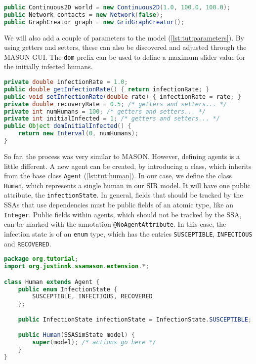 \documentclass[a4paper, 12pt, bibliography=numbered]{article}
\begin{document}
\begin{lstlisting}[label=lst:tut:environment,caption={The environment for our agents.},language=Java]
public Continuous2D world = new Continuous2D(1.0, 100.0, 100.0);
public Network contacts = new Network(false);
public GraphCreator graph = new GridGraphCreator();
\end{lstlisting}

We will also add a couple of parameters to the model (\autoref{lst:tut:parameters}). By using getters and setters, these can also be discovered and adjusted through the MASON GUI. The \texttt{dom}-prefix can be used to define a maximum slider value for the initially infected humans.

\begin{lstlisting}[label=lst:tut:parameters,caption={Parameters of the model.},language=Java]
private double infectionRate = 1.0;
public double getInfectionRate() { return infectionRate; }
public void setInfectionRate(double rate) { infectionRate = rate; }
private double recoveryRate = 0.5; /* getters and setters... */
private int numHumans = 100; /* getters and setters... */
private int initialInfected = 1; /* getters and setters... */
public Object domInitialInfected() {
	return new Interval(0, numHumans);
}
\end{lstlisting}

So far, the process was very similar to MASON. However, defining agents is a little different. A new agent can be created, by introducing a class, which inherits from the base class \texttt{Agent} (\autoref{lst:tut:human}). In our case, we define the class \texttt{Human}, which represents a single human in our SIR model. It will have one public attribute, the \texttt{infectionState}. In general, fields that should be tracked by the SSAs that use dependencies must be public fields of an atomic type, like an \texttt{Integer}. Public fields within agents, which should not be tracked by the SSA, can be marked with the annotation \texttt{@NoAgentAttribute}. In this case, the infection state is of an \texttt{enum} type, which has the entries \texttt{SUSCEPTIBLE}, \texttt{INFECTIOUS} and \texttt{RECOVERED}.

\begin{lstlisting}[label=lst:tut:human,caption={The basis of our Human agent.},language=Java]
package org.tutorial;
import org.justinnk.ssamason.extension.*;

class Human extends Agent {
    public enum InfectionState {
        SUSCEPTIBLE, INFECTIOUS, RECOVERED
    };

    public InfectionState infectionState = InfectionState.SUSCEPTIBLE;

    public Human(SSASimState model) {
        super(model); /* actions go here */
    }
}
\end{lstlisting}
\end{document}
